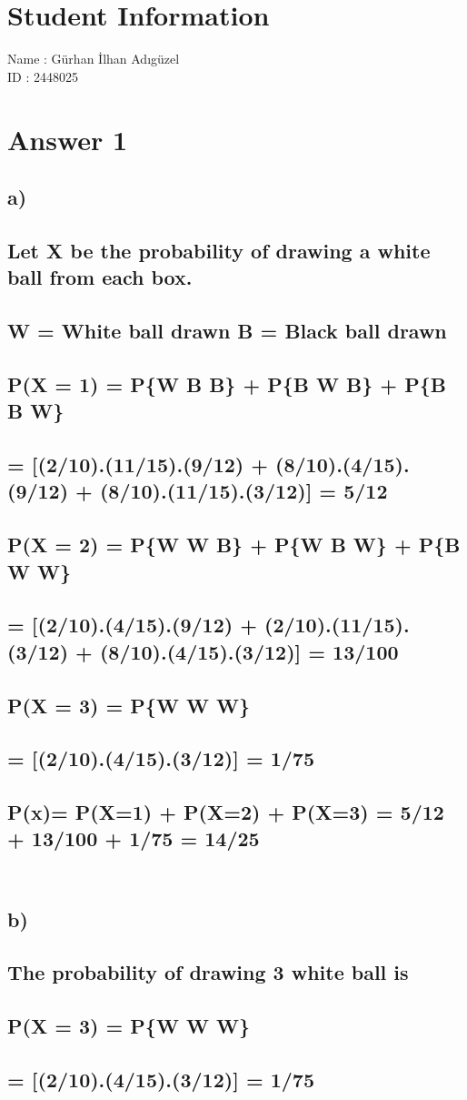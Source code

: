 \documentclass[15pt]{article}
\begin{document}
\section*{Student Information}
Name : Gürhan İlhan Adıgüzel\\

ID : 2448025 \\


\section*{Answer 1\\}
\subsection*{a) 
\\\\ Let X be the probability of drawing a white ball from each box. 
\\\\ W = White ball drawn  \hspace*{50} B = Black ball drawn
\\\\ \hspace*{50} P(X = 1) = P\{W B B\} + P\{B W B\} + P\{B B W\}
\\\\          = [(2/10).(11/15).(9/12) + (8/10).(4/15).(9/12) + (8/10).(11/15).(3/12)] = 5/12
\\\\ \hspace*{50} P(X = 2) = P\{W W B\} + P\{W B W\} + P\{B W W\}
\\\\          = [(2/10).(4/15).(9/12) + (2/10).(11/15).(3/12) + (8/10).(4/15).(3/12)] = 13/100
\\\\ \hspace*{50} P(X = 3) = P\{W W W\}
\\\\          = [(2/10).(4/15).(3/12)] = 1/75
\\\\ P(x)= P(X=1) + P(X=2) + P(X=3) = 5/12 + 13/100 + 1/75 = 14/25
\\\\
}
\subsection*{b)
\\\\ The probability of drawing 3 white ball is
\\\\ P(X = 3) = P\{W W W\}
\\\\ \hspace*{57} = [(2/10).(4/15).(3/12)] = 1/75
\\
}
\newpage
\end{document}

